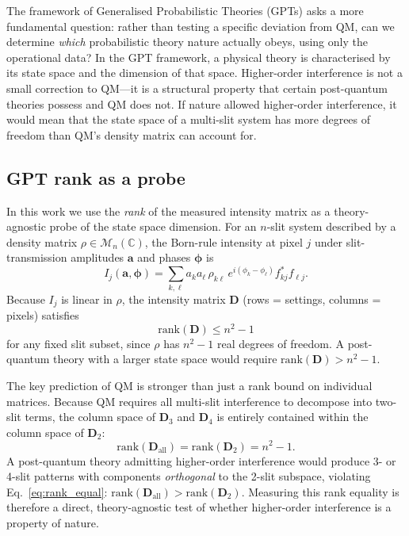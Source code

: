 \documentclass[12pt]{article}
\begin{document}
The framework of Generalised Probabilistic Theories (GPTs) asks a more fundamental
question: rather than testing a specific deviation from QM, can we determine
\emph{which} probabilistic theory nature actually obeys, using only the operational
data?  In the GPT framework, a physical theory is characterised by its state space
and the dimension of that space.  Higher-order interference is not a small
correction to QM---it is a structural property that certain post-quantum theories
possess and QM does not.  If nature allowed higher-order interference, it would
mean that the state space of a multi-slit system has more degrees of freedom than
QM's density matrix can account for.

\subsection{GPT rank as a probe}

In this work we use the \emph{rank} of the measured intensity matrix as a
theory-agnostic probe of the state space dimension.  For an $n$-slit system
described by a density matrix $\rho \in \mathcal{M}_{n}(\mathbb{C})$,
the Born-rule intensity at pixel $j$ under slit-transmission amplitudes
$\mathbf{a}$ and phases $\boldsymbol{\phi}$ is
\begin{equation}
    I_j(\mathbf{a},\boldsymbol{\phi})
    = \sum_{k,\ell} a_k a_\ell \,\rho_{k\ell}\, e^{i(\phi_k-\phi_\ell)} f_{kj}^* f_{\ell j}.
\end{equation}
Because $I_j$ is linear in $\rho$, the intensity matrix $\mathbf{D}$ (rows =
settings, columns = pixels) satisfies
\begin{equation}
    \mathrm{rank}(\mathbf{D}) \leq n^2 - 1
    \label{eq:rank_qm}
\end{equation}
for any fixed slit subset, since $\rho$ has $n^2 - 1$ real degrees of freedom.
A post-quantum theory with a larger state space would require
$\mathrm{rank}(\mathbf{D}) > n^2 - 1$.

The key prediction of QM is stronger than just a rank bound on individual matrices.
Because QM requires all multi-slit interference to decompose into two-slit terms,
the column space of $\mathbf{D}_3$ and $\mathbf{D}_4$ is entirely contained within
the column space of $\mathbf{D}_2$:
\begin{equation}
    \mathrm{rank}(\mathbf{D}_{\mathrm{all}}) = \mathrm{rank}(\mathbf{D}_2) = n^2 - 1.
    \label{eq:rank_equal}
\end{equation}
A post-quantum theory admitting higher-order interference would produce 3- or
4-slit patterns with components \emph{orthogonal} to the 2-slit subspace,
violating Eq.~\eqref{eq:rank_equal}:
$\mathrm{rank}(\mathbf{D}_{\mathrm{all}}) > \mathrm{rank}(\mathbf{D}_2)$.
Measuring this rank equality is therefore a direct, theory-agnostic test of
whether higher-order interference is a property of nature.
\end{document}

